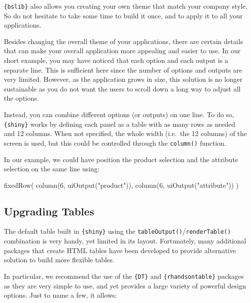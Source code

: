 \documentclass[
]{krantz}
\makeatletter
\newenvironment{Shaded}{\begin{snugshade}}{\end{snugshade}}
\newcommand{\DecValTok}[1]{\textcolor[rgb]{0.06,0.06,0.06}{#1}}
\newcommand{\FunctionTok}[1]{\textcolor[rgb]{0,0,0}{#1}}
\newcommand{\NormalTok}[1]{#1}
\newcommand{\StringTok}[1]{\textcolor[rgb]{0.5,0.5,0.5}{#1}}
\newenvironment{kframe}{%
\medskip{}
\setlength{\fboxsep}{.8em}
 \def\at@end@of@kframe{}%
 \ifinner\ifhmode%
  \def\at@end@of@kframe{\end{minipage}}%
  \begin{minipage}{\columnwidth}%
 \fi\fi%
 \def\FrameCommand##1{\hskip\@totalleftmargin \hskip-\fboxsep
 \colorbox{shadecolor}{##1}\hskip-\fboxsep
     \hskip-\linewidth \hskip-\@totalleftmargin \hskip\columnwidth}%
 \MakeFramed {\advance\hsize-\width
   \@totalleftmargin\z@ \linewidth\hsize
   \@setminipage}}%
 {\par\unskip\endMakeFramed%
 \at@end@of@kframe}
\renewenvironment{Shaded}{\begin{kframe}}{\end{kframe}}
\makeatother
\begin{document}
\texttt{\{bslib\}} also allows you creating your own theme that match your company style. So do not hesitate to take some time to build it once, and to apply it to all your applications.

Besides changing the overall theme of your applications, there are certain details that can make your overall application more appealing and easier to use. In our short example, you may have noticed that each option and each output is a separate line. This is sufficient here since the number of options and outputs are very limited. However, as the application grows in size, this solution is no longer sustainable as you do not want the users to scroll down a long way to adjust all the options.

Instead, you can combine different options (or outputs) on one line. To do so, \texttt{\{shiny\}} works by defining each panel as a table with as many rows as needed and 12 columns. When not specified, the whole width (i.e.~the 12 columns) of the screen is used, but this could be controlled through the \texttt{column()} function.

In our example, we could have position the product selection and the attribute selection on the same line using:

\begin{Shaded}
\begin{Highlighting}[]
\FunctionTok{fixedRow}\NormalTok{(}
  \FunctionTok{column}\NormalTok{(}\DecValTok{6}\NormalTok{, }\FunctionTok{uiOutput}\NormalTok{(}\StringTok{"product"}\NormalTok{)),}
  \FunctionTok{column}\NormalTok{(}\DecValTok{6}\NormalTok{, }\FunctionTok{uiOutput}\NormalTok{(}\StringTok{"attribute"}\NormalTok{))}
\NormalTok{)}
\end{Highlighting}
\end{Shaded}

\hypertarget{upgrading-tables}{%
\subsection{Upgrading Tables}\label{upgrading-tables}}

The default table built in \texttt{\{shiny\}} using the \texttt{tableOutput()}/\texttt{renderTable()} combination is very handy, yet limited in its layout. Fortunately, many additional packages that create HTML tables have been developed to provide alternative solution to build more flexible tables.

In particular, we recommend the use of the \texttt{\{DT\}} and \texttt{\{rhandsontable\}} packages as they are very simple to use, and yet provides a large variety of powerful design options. Just to name a few, it allows:
\end{document}
